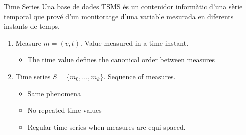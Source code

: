 




\begin{frame}{Time Series}
  Una base de dades TSMS és un contenidor informàtic d'una
  sèrie temporal que prové d'un monitoratge d'una variable mesurada en
  diferents instants de temps.

  \begin{enumerate}

  \item Measure $m=(v,t)$. Value measured in a time instant.
    \begin{itemize}
    \item The time value defines the canonical order between measures
    \end{itemize}

  \item Time series $S=\{m_0,\ldots,m_k\}$. Sequence of measures.
    \begin{itemize}
    \item Same phenomena
    \item No repeated time values
    \item Regular time series when measures are equi-spaced.
    \end{itemize}

  \end{enumerate}

\end{frame}



